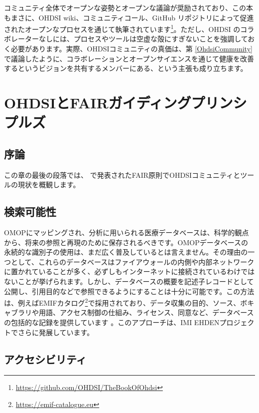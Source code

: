 \documentclass[
  11pt]{book}
\theoremstyle{definition}
\theoremstyle{definition}
\theoremstyle{definition}
\theoremstyle{definition}
\theoremstyle{remark}
\begin{document}
コミュニティ全体でオープンな姿勢とオープンな議論が奨励されており、この本もまさに、OHDSI wiki、コミュニティコール、GitHub リポジトリによって促進されたオープンなプロセスを通じて執筆されています\footnote{\url{https://github.com/OHDSI/TheBookOfOhdsi}}。ただし、OHDSI のコラボレーターなしには、プロセスやツールは空虚な殻にすぎないことを強調しておく必要があります。実際、OHDSIコミュニティの真価は、第 \ref{OhdsiCommunity} で議論したように、コラボレーションとオープンサイエンスを通じて健康を改善するというビジョンを共有するメンバーにある、という主張も成り立ちます。

\section{OHDSIとFAIRガイディングプリンシプルズ}\label{ohdsiux3068fairux30acux30a4ux30c7ux30a3ux30f3ux30b0ux30d7ux30eaux30f3ux30b7ux30d7ux30ebux30ba}


\subsection{序論}\label{ux5e8fux8ad6}

この章の最後の段落では、\citet{wilkinson2016} で発表されたFAIR原則でOHDSIコミュニティとツールの現状を概観します。

\subsection{検索可能性}\label{ux691cux7d22ux53efux80fdux6027}

OMOPにマッピングされ、分析に用いられる医療データベースは、科学的観点から、将来の参照と再現のために保存されるべきです。OMOPデータベースの永続的な識別子の使用は、まだ広く普及しているとは言えません。その理由の一つとして、これらのデータベースはファイアウォールの内側や内部ネットワークに置かれていることが多く、必ずしもインターネットに接続されているわけではないことが挙げられます。しかし、データベースの概要を記述子レコードとして公開し、引用目的などで参照できるようにすることは十分に可能です。この方法は、例えばEMIFカタログ\footnote{\url{https://emif-catalogue.eu}}で採用されており、データ収集の目的、ソース、ボキャブラリや用語、アクセス制御の仕組み、ライセンス、同意など、データベースの包括的な記録を提供しています \citep{Oliveira2019}。このアプローチは、IMI EHDENプロジェクトでさらに発展しています。

\subsection{アクセシビリティ}\label{ux30a2ux30afux30bbux30b7ux30d3ux30eaux30c6ux30a3}
\end{document}
